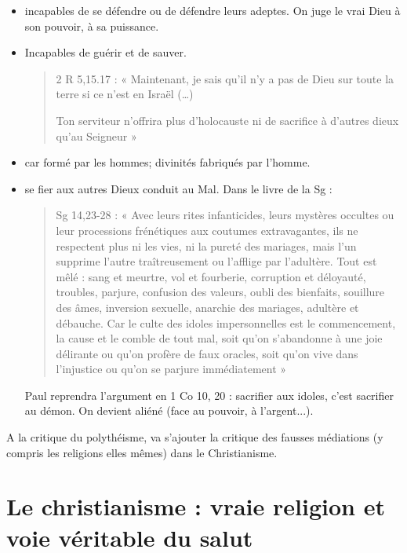 \begin{itemize}
    \item incapables de se défendre ou de défendre leurs adeptes. On juge le vrai Dieu à son pouvoir, à sa puissance.
    \item Incapables de guérir et de sauver. 
\begin{quote}
    2 R 5,15.17 : « Maintenant, je sais qu’il n’y a pas de Dieu sur toute la terre si ce n’est en Israël (…)
    
Ton serviteur n’offrira plus d’holocauste ni de sacrifice à d’autres dieux qu’au Seigneur » 
\end{quote}
\item car formé par les hommes; divinités fabriqués par l'homme. 
\item se fier aux autres Dieux conduit au Mal. Dans le livre de la Sg : 
\begin{quote}
    Sg 14,23-28 : « Avec leurs rites infanticides, leurs mystères occultes ou leur processions frénétiques
aux coutumes extravagantes, ils ne respectent plus ni les vies, ni la pureté des mariages, mais l’un
supprime l’autre traîtreusement ou l’afflige par l’adultère. Tout est mêlé : sang et meurtre, vol et
fourberie, corruption et déloyauté, troubles, parjure, confusion des valeurs, oubli des bienfaits,
souillure des âmes, inversion sexuelle, anarchie des mariages, adultère et débauche. Car le culte des
idoles impersonnelles est le commencement, la cause et le comble de tout mal, soit qu’on s’abandonne
à une joie délirante ou qu’on profère de faux oracles, soit qu’on vive dans l’injustice ou qu’on se
parjure immédiatement »
\end{quote}
Paul reprendra l'argument en 1 Co 10, 20 : sacrifier aux idoles, c'est sacrifier au démon. 
On devient aliéné (face au pouvoir, à l'argent...). 
\end{itemize}

\begin{Synthesis}
A la critique du polythéisme, va s'ajouter la critique des fausses médiations (y compris les religions elles mêmes) dans le Christianisme.
\end{Synthesis}




\section{Le christianisme : vraie religion et voie véritable du salut}
 
